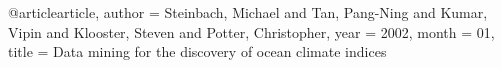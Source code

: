 @article{article,
author = {Steinbach, Michael and Tan, Pang-Ning and Kumar, Vipin and Klooster, Steven and Potter, Christopher},
year = {2002},
month = {01},
title = {Data mining for the discovery of ocean climate indices}
}
